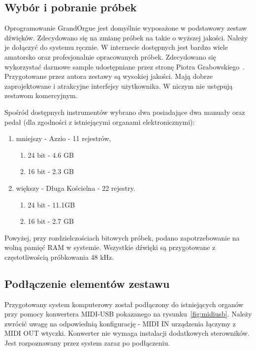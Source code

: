 \documentclass[11pt]{report}
\begin{document}
    \subsection{Wybór i pobranie próbek}
    Oprogramowanie GrandOrgue jest domyślnie wyposażone w podstawowy zestaw dźwięków.
    Zdecydowano się na zmianę próbek na takie o wyższej jakości.
    Należy je dołączyć do systemu ręcznie.
    W internecie dostępnych jest bardzo wiele amatorsko oraz profesjonalnie opracowanych próbek.
    Zdecydowano się wykorzystać darmowe sample udostępniane przez stronę Piotra Grabowskiego~\cite{grabowski}.
    Przygotowane przez autora zestawy są wysokiej jakości.
    Mają dobrze zaprojektowane i atrakcyjne interfejsy użytkownika.
    W niczym nie ustępują zestawom komercyjnym.

    Spośród dostępnych instrumentów wybrano dwa posiadające dwa manuały oraz pedał (dla zgodności z istniejącymi organami elektronicznymi):
    \begin{enumerate}
        \item mniejszy - Azzio - 11 rejestrów,
        \begin{enumerate}
            \item 24 bit - 4.6 GB
            \item 16 bit - 2.3 GB
        \end{enumerate}
        \item większy - Długa Kościelna - 22 rejestry.
        \begin{enumerate}
            \item 24 bit - 11.1GB
            \item 16 bit - 2.7 GB
        \end{enumerate}
    \end{enumerate}
    Powyżej, przy rozdzielczościach bitowych próbek, podano zapotrzebowanie na wolną pamięć RAM w systemie.
    Wszystkie dźwięki są przygotowane z częstotliwością próbkowania 48 kHz.

    \subsection{Podłączenie elementów zestawu}
    Przygotowany system komputerowy został podłączony do istniejących organów przy pomocy konwertera MIDI-USB pokazanego na rysunku~\ref{fig:midiusb}.
    Należy zwrócić uwagę na odpowiednią konfigurację - MIDI IN urządzenia łączymy z MIDI OUT wtyczki.
    Konwerter nie wymaga instalacji dodatkowych sterowników.
    Jest rozpoznawany przez system zaraz po podłączeniu.
\end{document}

